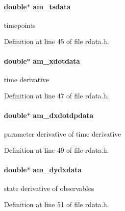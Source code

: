 \paragraph[{am\+\_\+tsdata}]{\setlength{\rightskip}{0pt plus 5cm}double$\ast$ am\+\_\+tsdata}\label{struct_return_data_a577298549da7c9dbe3d93fbf3bc17866}
timepoints 

Definition at line 45 of file rdata.\+h.

\hypertarget{struct_return_data_a3ea8fa08fcced0827c1df276b0d253c8}{}
\paragraph[{am\+\_\+xdotdata}]{\setlength{\rightskip}{0pt plus 5cm}double$\ast$ am\+\_\+xdotdata}\label{struct_return_data_a3ea8fa08fcced0827c1df276b0d253c8}
time derivative 

Definition at line 47 of file rdata.\+h.

\hypertarget{struct_return_data_a494b13e9797d95d7fb3c89e09864aa4f}{}
\paragraph[{am\+\_\+dxdotdpdata}]{\setlength{\rightskip}{0pt plus 5cm}double$\ast$ am\+\_\+dxdotdpdata}\label{struct_return_data_a494b13e9797d95d7fb3c89e09864aa4f}
parameter derivative of time derivative 

Definition at line 49 of file rdata.\+h.

\hypertarget{struct_return_data_a831cada35b4f407a2c8ad789dfc534e5}{}
\paragraph[{am\+\_\+dydxdata}]{\setlength{\rightskip}{0pt plus 5cm}double$\ast$ am\+\_\+dydxdata}\label{struct_return_data_a831cada35b4f407a2c8ad789dfc534e5}
state derivative of observables 

Definition at line 51 of file rdata.\+h.

\hypertarget{struct_return_data_a57a7eb2085d8ed5bb6c62331a2aa3af5}{}
